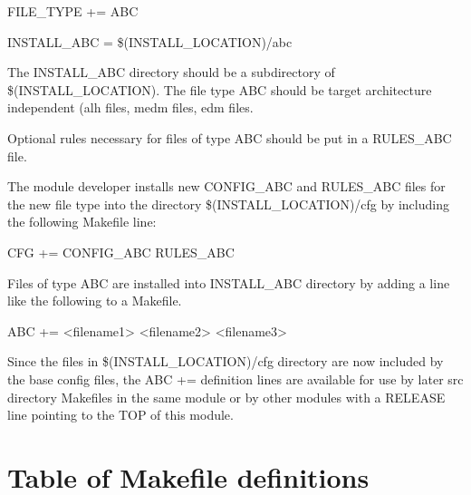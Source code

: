 \begin{description}\item {}FILE\_TYPE += ABC

\item INSTALL\_ABC = \$(INSTALL\_LOCATION)/abc

\end{description}The INSTALL\_ABC directory should be a subdirectory of \$(INSTALL\_LOCATION). The file type ABC should be 
target architecture independent (alh files, medm files, edm files.

Optional rules necessary for files of type ABC should be put in a RULES\_ABC file.

The module developer installs new CONFIG\_ABC and RULES\_ABC files for the new file type into the directory 
\$(INSTALL\_LOCATION)/cfg by including the following Makefile line:

\begin{description}\item       {}CFG += CONFIG\_ABC RULES\_ABC

\end{description}Files of type ABC are installed into INSTALL\_ABC directory by adding a line like the following to a Makefile.

\begin{description}\item       ABC += \textless{}filename1\textgreater{} \textless{}filename2\textgreater{} \textless{}filename3\textgreater{}

\end{description}Since the files in \$(INSTALL\_LOCATION)/cfg directory are now included by the base config files, the ABC += 
definition lines are available for use by later src directory Makefiles in the same module or by other modules with a 
RELEASE line pointing to the TOP of this module.

\section{Table of Makefile definitions}

